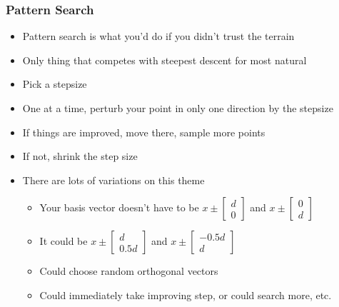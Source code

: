 \documentclass{beamer}
\begin{document}
\begin{frame}
\frametitle[alignment=center]{Pattern Search}
\begin{itemize}
\item Pattern search is what you'd do if you didn't trust the terrain
\item Only thing that competes with steepest descent for most natural
\item Pick a stepsize
\item One at a time, perturb your point in only one direction by the stepsize
\item If things are improved, move there, sample more points
\item If not, shrink the step size
\item There are lots of variations on this theme
\begin{itemize}
\item Your basis vector doesn't have to be $x\pm\left[\begin{array}{c}d \\ 0\end{array}\right]$ and $x\pm\left[\begin{array}{c}0 \\ d\end{array}\right]$
\item It could be $x\pm\left[\begin{array}{c}d \\ 0.5d\end{array}\right]$ and $x\pm\left[\begin{array}{c}-0.5d \\ d\end{array}\right]$
\item Could choose random orthogonal vectors
\item Could immediately take improving step, or could search more, etc.
\end{itemize} 
\end{itemize}
\end{frame}
\end{document}
